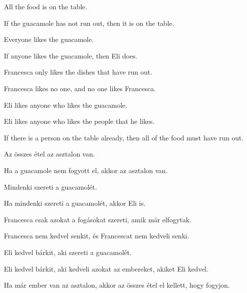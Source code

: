 \begin{earg}
\item All the food is on the table.
\item If the guacamole has not run out, then it is on the table.
\item Everyone likes the guacamole.
\item If anyone likes the guacamole, then Eli does.
\item Francesca only likes the dishes that have run out.
\item Francesca likes no one, and no one likes Francesca.
\item Eli likes anyone who likes the guacamole.
\item Eli likes anyone who likes the people that he likes.
\item If there is a person on the table already, then all of the food must have run out.
\end{earg}

\begin{earg}
\item Az összes étel az asztalon van.
\item Ha a guacamole nem fogyott el, akkor az asztalon van.
\item Mindenki szereti a guacamolét.
\item Ha mindenki szereti a guacamolét, akkor Eli is.
\item Francesca csak azokat a fogásokat szereti, amik már elfogytak.
\item Francesca nem kedvel senkit, és Francescat nem kedveli senki.
\item Eli kedvel bárkit, aki szereti a guacamolét.
\item Eli kedvel bárkit, aki kedveli azokat az embereket, akiket Eli kedvel.
\item Ha már ember van az asztalon, akkor az összes étel el kellett, hogy fogyjon.
\end{earg}



